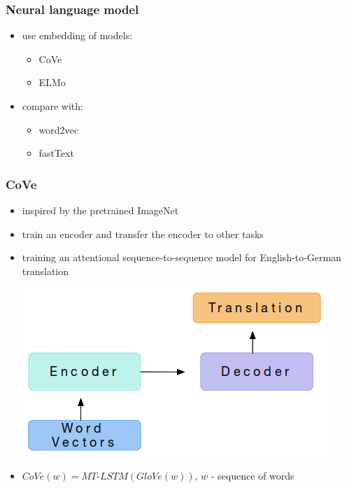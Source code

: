 \documentclass{beamer}
\begin{document}
\begin{frame}
    \frametitle{Neural language model}
    \begin{itemize}

        \item use embedding of models:
        \begin{itemize}
            \item CoVe \cite{CoVe}
            \item ELMo \cite{ELMo}
        \end{itemize}
        \item compare with:
        \begin{itemize}
            \item word2vec \cite{word2vec}
            \item fastText \cite{fastText}
        \end{itemize}
    \end{itemize}
\end{frame}

\begin{frame}
    \frametitle{CoVe}
    \begin{itemize}
        \item inspired by the pretrained ImageNet
        \item train an encoder and transfer the encoder to other tasks
        \item training an attentional sequence-to-sequence model for English-to-German translation
        \begin{center}
            \includegraphics{img/CoVe-encoder.png}
        \end{center}
        \item $ CoVe(w) = MT$-$LSTM(GloVe(w))$, $w$ - sequence of words
    \end{itemize}
\end{frame}
\end{document}
